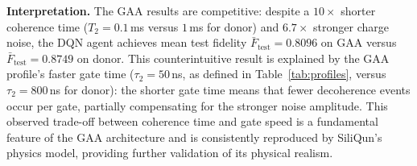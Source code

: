 \begin{table}[ht]
\centering
\caption{Extension~3 results: DQN universal state preparation on SiliQun \texttt{gaa\_nominal} profile (all 5 seeds complete). No published target exists; this is the first ML benchmark on GAA silicon spin qubits. $\bar{F}_\text{test}$ = mean test fidelity across 5 seeds; $F_\text{train}^\star$ = best training fidelity across 5 seeds.}
\label{tab:e3_results}
\end{table}

\textbf{Interpretation.} The GAA results are competitive: despite a $10\times$ shorter coherence time ($T_2 = 0.1$\,ms versus $1$\,ms for donor) and $6.7\times$ stronger charge noise, the DQN agent achieves mean test fidelity $\bar{F}_\text{test} = 0.8096$ on GAA versus $\bar{F}_\text{test} = 0.8749$ on donor. This counterintuitive result is explained by the GAA profile's faster gate time ($\tau_2 = 50$\,ns, as defined in Table~\ref{tab:profiles}, versus $\tau_2 = 800$\,ns for donor): the shorter gate time means that fewer decoherence events occur per gate, partially compensating for the stronger noise amplitude. This observed trade-off between coherence time and gate speed is a fundamental feature of the GAA architecture and is consistently reproduced by SiliQun's physics model, providing further validation of its physical realism.

